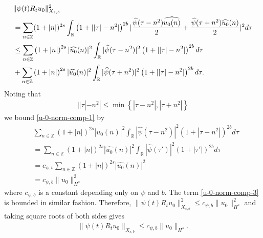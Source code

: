 \documentclass[12pt,reqno]{amsart}
\numberwithin{equation}{section}  %
\numberwithin{figure}{section}
\newcommand{\rr}{\mathbb{R}}
\newcommand{\zz}{\mathbb{Z}}
\newcommand{\wh}{\widehat}
\theoremstyle{plain}
\theoremstyle{definition}
\theoremstyle{remark}
\begin{document}
%
%
\begin{align}
    & \| \psi(t) R_{t}u_{0} \|_{X_{s,b}}^{2} 
    \notag
    \\
    & = \sum_{n \in \zz}(1 + |n|)^{2s} \int_{\rr}\left( 1 + | | \tau
    |-n^{2} | \right)^{2b} | \frac{\wh{\psi}(\tau - n^{2})\wh{u_{0}(n)}}{2} +
    \frac{\wh{\psi}(\tau + n^{2})\wh{u_{0}}(n)}{2} |^{2} d \tau
    \notag
    \\
    & \le \sum_{n \in \zz} \left( 1 + |n| \right)^{2s} | \wh{u_{0}}(n)
    |^{2} \int_{\rr} | \wh{\psi}(\tau - n^{2}) |^{2}\left( 1 + | | \tau | -
    n^{2} | \right)^{2b} d \tau
    \label{u-0-norm-comp-1}
    \\
    & + \sum_{n \in \zz} \left( 1 + |n| \right)^{2s} | \wh{u_{0}}(n)
    |^{2} \int_{\rr} | \wh{\psi}(\tau + n^{2}) |^{2}\left( 1 + | | \tau | -
    n^{2} | \right)^{2b} d \tau.
    \label{u-0-norm-comp-3}
\end{align}
%
Noting that
\begin{equation}
  \begin{split}
    | | \tau | - n^{2} | \le \min\left\{ | \tau - n^{2} |, | \tau + n^{2} | \right\}
  \end{split}
  \label{eqn:norm-key-ineq}
\end{equation}
%
%
we bound \eqref{u-0-norm-comp-1} by
%
%
\begin{equation*}
  \begin{split}
    & \sum_{n \in \zz} \left( 1 + |n| \right)^{2s} | \wh{u_{0}}(n)
    |^{2} \int_{\rr} | \wh{\psi}(\tau - n^{2}) |^{2}\left( 1 +  | \tau  -
    n^{2} | \right)^{2b} d \tau
    \\
    & = \sum_{n \in \zz} \left( 1 + |n| \right)^{2s} | \wh{u_{0}}(n)
    |^{2} \int_{\rr} | \wh{\psi}(\tau') |^{2}\left( 1 +  | \tau'| \right)^{2b} d \tau
    \\
    & = c_{\psi, b} \sum_{n \in \zz} \left( 1 + |n| \right)^{2s} | \wh{u_{0}}(n)
    |^{2} 
    \\
    & = c_{\psi, b} \| u_{0} \|_{H^{s}}^{2}
  \end{split}
\end{equation*}
%
%
where $c_{\psi, b}$ is a constant depending only on $\psi$ and $b$. The
term \eqref{u-0-norm-comp-3} is bounded in similar fashion. Therefore, 
$\|\psi(t) R_{t} u_{0}\|_{X_{s,b}}^{2} \le c_{\psi, b}
\|u_{0}\|_{H^s}^2$ and
taking square roots of both sides gives
%
%
\begin{equation}
  \begin{split}
    \|\psi(t) R_{t} u_{0}\|_{X_{s,b}} \le c_{\psi, b}
    \|u_{0}\|_{H^s}.
  \end{split}
  \label{eqn:u-0-fin-est}
\end{equation}
%
%
\end{document}
